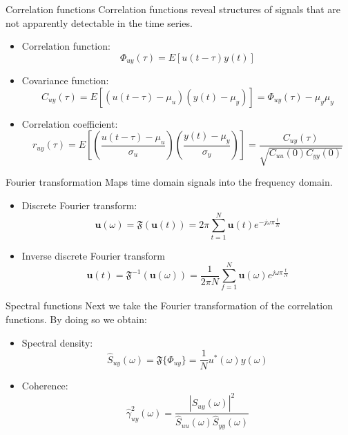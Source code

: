 \documentclass{beamer}
\begin{document}
\begin{frame}{Correlation functions}
		Correlation functions reveal structures of signals that are not apparently detectable in the time series.
		\begin{itemize}
		\item Correlation function:
				\begin{equation} \Phi_{uy}(\tau) = E\left[u(t-\tau)y(t)\right] \end{equation}
		\item Covariance function:
				\begin{equation} C_{uy}(\tau) = E\left[\left(u(t-\tau)-\mu_u\right)\left(y(t)-\mu_y\right)\right] =   \Phi_{uy}(\tau) - \mu_y\mu_y \end{equation} 
		\item Correlation coefficient:
				\begin{equation} r_{uy}(\tau) = E\left[ \left(\frac{u(t-\tau)-\mu_u}{\sigma_u}\right)\left(\frac{y(t)-\mu_y}{\sigma_y}\right)\right]  = 
				   \frac{C_{uy}(\tau)}{\sqrt{C_{uu}(0)C_{yy}(0)}} \end{equation}
		\end{itemize}
\end{frame}

\begin{frame}{Fourier transformation}
		Maps time domain signals into the frequency domain.
		\begin{itemize}
				\item Discrete Fourier transform:
				\begin{equation}
						\mathbf{u}(\omega) = \mathfrak{F}(\mathbf{u}(t)) = 2\pi\sum_{t=1}^N\mathbf{u}(t)e^{-j\omega\pi\frac{t}{N}} 
				\end{equation}
		\item Inverse discrete Fourier transform
	 				\begin{equation}
						\mathbf{u}(t) = \mathfrak{F}^{-1}(\mathbf{u}(\omega)) = \frac{1}{2\pi N} \sum_{f=1}^N\mathbf{u}(\omega)e^{j\omega\pi\frac{t}{N}} 
				\end{equation}
		\end{itemize}
\end{frame}

\begin{frame}{Spectral functions}
Next we take the Fourier transformation of the correlation functions. By doing so we obtain:
		\begin{itemize}
		\item Spectral density:
				\begin{equation}
				\hat{S}_{uy}(\omega) =  \mathfrak{F}\{\Phi_{uy}\} = \frac{1}{N}u^*(\omega)y(\omega)
				\end{equation}
		\item Coherence:
				\begin{equation}
				\hat{\gamma}^2_{uy}(\omega)  = \frac{\left|\hat{S}_{uy}(\omega)\right|^2}{\hat{S}_{uu}(\omega)\hat{S}_{yy}(\omega)}
				\end{equation}
		\end{itemize}
\end{frame}
\end{document}
